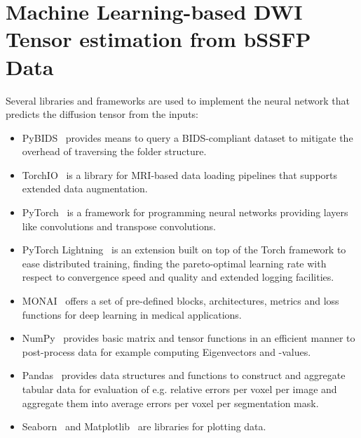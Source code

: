 \section{Machine Learning-based DWI Tensor estimation from bSSFP Data}
Several libraries and frameworks are used to implement the neural network that predicts the diffusion tensor from the inputs:
\begin{itemize}
 \item PyBIDS~\autocite{yarkoni_pybids_2019} provides means to query a BIDS-compliant dataset to mitigate the overhead of traversing the folder structure.
 \item TorchIO~\autocite{perez-garcia_torchio_2021} is a library for MRI-based data loading pipelines that supports extended data augmentation.
 \item PyTorch~\autocite{paszke_pytorch_2019} is a framework for programming neural networks providing layers like convolutions and transpose convolutions.
 \item PyTorch Lightning~\autocite{falcon_pytorch_2019} is an extension built on top of the Torch framework to ease distributed training, finding the pareto-optimal learning rate with respect to convergence speed and quality and extended logging facilities.
 \item MONAI~\autocite{cardoso_monai_2022} offers a set of pre-defined blocks, architectures, metrics and loss functions for deep learning in medical applications.
 \item NumPy~\autocite{harris_array_2020} provides basic matrix and tensor functions in an efficient manner to post-process data for example computing Eigenvectors and -values.
 \item Pandas~\autocite{reback_pandas-devpandas_2020} provides data structures and functions to construct and aggregate tabular data for evaluation of e.g. relative errors per voxel per image and aggregate them into average errors per voxel per segmentation mask.
 \item Seaborn~\autocite{waskom_seaborn_2021} and Matplotlib~\autocite{hunter_matplotlib_2007} are libraries for plotting data.
\end{itemize}

